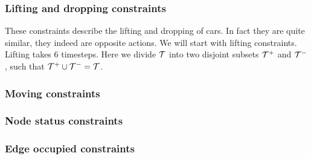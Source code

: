 \subsubsection{Lifting and dropping constraints}
These constraints describe the lifting and dropping of cars. In fact they are
quite similar, they indeed are opposite actions. We will start with lifting
constraints. Lifting takes 6 timesteps. Here we divide $\mathcal{T}$ into two disjoint
subsets $\mathcal{T}^+$ and $\mathcal{T}^-$, such that $\mathcal{T}^+ \cup \mathcal{T}^- = \mathcal{T}$.
\subsubsection{Moving constraints}
\subsubsection{Node status constraints}
\subsubsection{Edge occupied constraints}
